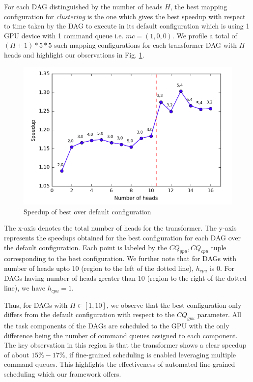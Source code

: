 	\par  For each DAG distinguished by the number of heads $H$, the best mapping configuration for {\em clustering} is the one which gives the best  speedup with respect to time taken by the DAG to execute in its default configuration which is using 1 GPU device with 1 command queue i.e. $mc=(1,0,0)$. We profile a total of $(H+1)*5*5$ such mapping configurations for each transformer DAG with $H$ heads and highlight our observations in  Fig. \ref{fig:Expt1}. 
	\begin{figure}[ht]
		\centering
		\includegraphics[scale=0.45]{Pictures/Expt-1.png}
		\caption{\small Speedup of best over default configuration \label{fig:Expt1}}
	\end{figure}
	The x-axis denotes the total number of heads for the transformer. The y-axis represents the speedups obtained for the best configuration for each DAG over the default configuration. Each point is labeled by the $CQ_{gpu},CQ_{cpu}$ tuple corresponding to the best configuration. We further note that for DAGs with number of heads upto 10 (region to the left of the dotted line), $h_{cpu}$ is 0. For DAGs having  number of heads greater than 10 (region to the right of the dotted line), we have $h_{cpu}=1$. 
	\par Thus, for DAGs with $H \in [1,10]$, we observe that the best configuration only differs from the default configuration with respect to the $CQ_{gpu}$ parameter. All the task components of the DAGs are scheduled to the GPU with the only difference being the number of command queues assigned to each component. The key observation in this region is that the transformer shows a clear speedup of about $15\% - 17\%$, if fine-grained scheduling is enabled leveraging multiple command queues. This highlights the effectiveness of automated fine-grained scheduling which our framework offers.
